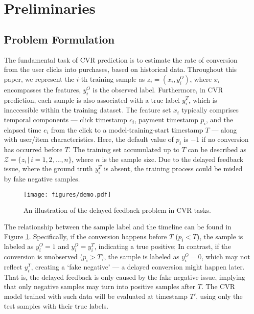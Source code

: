 \section{Preliminaries}
\subsection{Problem Formulation}
The fundamental task of CVR prediction is to estimate the rate of conversion from the user clicks into purchases, based on historical data. Throughout this paper, we represent the $i$-th training sample as $z_i = (x_i, y_i^{O})$, where $x_i$ encompasses the features, $y_i^{O}$ is the observed label. Furthermore, in CVR prediction, each sample is also associated with a true label $y_i^{T}$, which is inaccessible within the training dataset. The feature set $x_i$ typically comprises temporal components --- click timestamp $c_i$, payment timestamp $p_i$, and the elapsed time $e_i$ from the click to a model-training-start timestamp $T$  --- along with user/item characteristics.
Here, the default value of $p_i$ is $-1$ if no conversion has occurred before $T$. The training set accumulated up to $T$ can be described as $\mathcal{Z} = \{ z_i \,|\, i=1,2,...,n\}$, where $n$ is the sample size. Due to the delayed feedback issue, where the ground truth $y_i^{T}$ is absent, the training process could be misled by fake negative samples. 
\begin{figure}[t]
    \centering
    \texttt{[image: figures/demo.pdf]}
    \vspace{-15pt}
    \caption{An illustration of the delayed feedback problem in CVR tasks.}
    \label{fig:demo}
    \vspace{-15pt}
\end{figure}
The relationship between the sample label and the timeline can be found in Figure \ref{fig:demo}. Specifically, if the conversion happens before $T$ (\ie $p_i < T$), the sample is labeled as $y_i^{O} = 1$ and $y_i^{O} = y_i^{T}$, indicating a true positive; In contrast, if the conversion is unobserved (\ie $p_i > T$), the sample is labeled as $y_i^{O} = 0$, which may not reflect $y_i^T$, creating a `fake negative' --- a delayed conversion might happen later. That is, the delayed feedback is only caused by the fake negative issue, implying that only negative samples may turn into positive samples after $T$. The CVR model trained with such data will be evaluated at timestamp $T'$, using only the test samples with their true labels.

